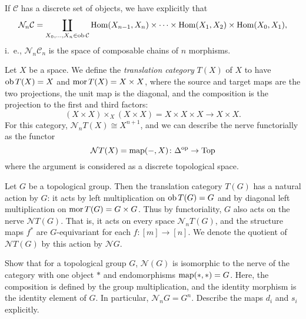 \documentclass[a4paper,openany]{scrbook}
\renewcommand{\C}{\mathcal C}
\newcommand{\nerve}{\mathcal N}
\begin{document}
If $\C$ has a discrete set of objects, we have explicitly that
\[
\nerve_n\C = \coprod_{X_0,\dots,X_n \in \ob \C} \Hom(X_{n-1},X_n) \times \dots \times \Hom(X_1,X_2) \times \Hom(X_0,X_1),
\]
i.~e., $\nerve_n\C_n$ is the space of composable chains of $n$ morphisms.

\begin{example}\label{ex:translationcat}
Let $X$ be a space. We define the \emph{translation category} $T(X)$ of $X$ to have $\operatorname{ob} T(X) = X$ and $\operatorname{mor} T(X) = X \times X$, where the source and target maps are the two projections, the unit map is the diagonal, and the composition is the projection to the first and third factors:
\[
(X \times X) \times_X (X \times X) = X \times X \times X \to X \times X.
\]
For this category, $\nerve_n T(X) \cong X^{n+1}$, and we can describe the nerve functorially as the functor
\[
\nerve T(X) = \map(-,X)\colon \Delta^\op \to \Top
\]
where the argument is considered as a discrete topological space.
\end{example}

\begin{example}\label{ex:translationcatofgroup}
Let $G$ be a topological group. Then the translation category $T(G)$ has a natural action by $G$: it acts by left multiplication on $\operatorname{ob} T(G) = G$ and by diagonal left multiplication on $\operatorname{mor} T(G) = G \times G$. Thus by functoriality, $G$ also acts on the nerve $\nerve T(G)$. That is, it acts on every space $\nerve_n T(G)$, and the structure maps $f^*$ are $G$-equivariant for each $f\colon [m] \to [n]$. We denote the quotient of $\nerve T(G)$ by this action by $\nerve G$.
\end{example}

\begin{exer}
Show that for a topological group $G$, $\nerve(G)$ is isomorphic to the nerve of the category with one object $*$ and endomorphisms $\operatorname{map}(*,*)=G$. Here, the composition is defined by the group multiplication, and the identity morphism is the identity element of $G$. In particular, $\nerve_nG = G^n$. Describe the maps $d_i$ and $s_i$ explicitly.
\end{exer}
\end{document}
